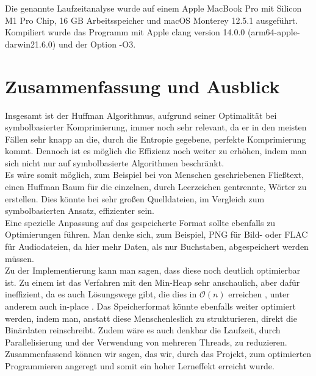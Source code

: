 \documentclass[course=erap]{aspdoc}
\begin{document}
\begin{center}
Die genannte Laufzeitanalyse wurde auf einem Apple MacBook Pro mit Silicon M1 Pro Chip, 16 GB Arbeitsspeicher und macOS Monterey 12.5.1 ausgeführt. Kompiliert wurde das Programm mit Apple clang version 14.0.0 (arm64-apple-darwin21.6.0) und der Option -O3.
\end{center}

\section{Zusammenfassung und Ausblick}

Insgesamt ist der Huffman Algorithmus, aufgrund seiner Optimalität bei symbolbasierter Komprimierung, immer noch sehr relevant, da er in den meisten Fällen sehr knapp an die, durch die Entropie gegebene, perfekte Komprimierung kommt.
Dennoch ist es möglich die Effizienz noch weiter zu erhöhen, indem man sich nicht nur auf symbolbasierte Algorithmen beschränkt.\\
Es wäre somit möglich, zum Beispiel bei von Menschen geschriebenen Fließtext, einen Huffman Baum für die einzelnen, durch Leerzeichen gentrennte, Wörter zu erstellen. Dies könnte bei sehr großen Quelldateien, im Vergleich zum symbolbasierten Ansatz, effizienter sein.\\
Eine spezielle Anpassung auf das gespeicherte Format sollte ebenfalls zu Optimierungen führen. Man denke sich, zum Beispiel, PNG für Bild- oder FLAC für Audiodateien, da hier mehr Daten, als nur Buchstaben, abgespeichert werden müssen.\\
Zu der Implementierung kann man sagen, dass diese noch deutlich optimierbar ist. Zu einem ist das Verfahren mit den Min-Heap sehr anschaulich, aber dafür ineffizient, da es auch Lösungswege gibt, die dies in $\mathcal{O}(n)$ erreichen \cite{Leeuwen1976OnTC}, unter anderem auch in-place \cite{10.1007/3-540-60220-8_79}.
Das Speicherformat könnte ebenfalls weiter optimiert werden, indem man, anstatt diese Menschenleslich zu strukturieren, direkt die Binärdaten reinschreibt. Zudem wäre es auch denkbar die Laufzeit, durch Parallelisierung und der Verwendung von mehreren Threads, zu reduzieren.\\
Zusammenfassend können wir sagen, das wir, durch das Projekt, zum optimierten Programmieren angeregt und somit ein hoher Lerneffekt erreicht wurde.


{}
\end{document}
